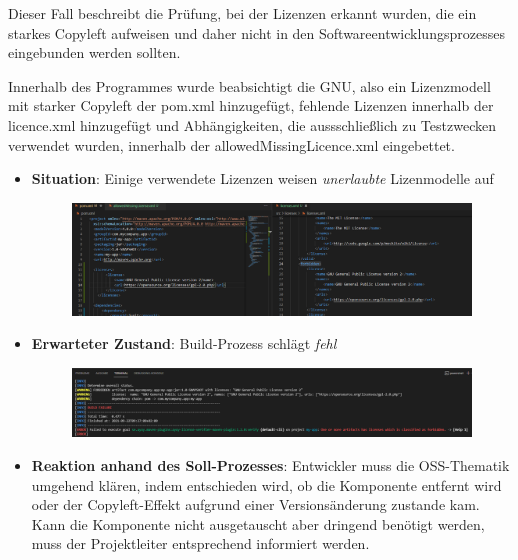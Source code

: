 Dieser Fall beschreibt die Prüfung, bei der Lizenzen erkannt wurden, die ein starkes Copyleft aufweisen und daher nicht in den Softwareentwicklungsprozesses eingebunden werden sollten.

Innerhalb des Programmes wurde beabsichtigt die GNU, also ein Lizenzmodell mit starker Copyleft der pom.xml hinzugefügt, fehlende Lizenzen innerhalb der licence.xml hinzugefügt und Abhängigkeiten, die aussschließlich zu Testzwecken verwendet wurden, innerhalb der allowedMissingLicence.xml eingebettet. 

\begin{itemize}
    \item \textbf{Situation}: Einige verwendete Lizenzen weisen \textit{unerlaubte} Lizenmodelle auf
    
    \begin{figure}[h]
        \centering
        \includegraphics[scale=0.4]{Bilder/Fall2Situation.png}
    \end{figure}

    \item \textbf{Erwarteter Zustand}: Build-Prozess schlägt \textit{fehl} 
    
    \begin{figure}[h]
        \centering
        \includegraphics[scale=0.4]{Bilder/Fall2Zustand.png}
    \end{figure}

    \item \textbf{Reaktion anhand des Soll-Prozesses}: Entwickler muss die OSS-Thematik umgehend klären, indem entschieden wird, ob die Komponente entfernt wird oder der Copyleft-Effekt aufgrund einer Versionsänderung zustande kam. Kann die Komponente nicht ausgetauscht aber dringend benötigt werden, muss der Projektleiter entsprechend informiert werden.  
\end{itemize}

